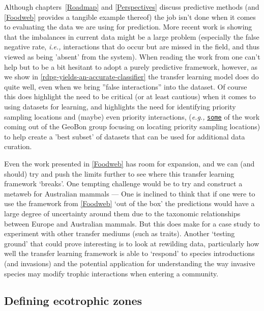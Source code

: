 Although chapters~\ref{Roadmap} and \ref{Perspectives} discuss predictive methods (and \autoref{Foodweb} provides a tangible example thereof) the job isn't done when it comes to evaluating the data we are using for prediction. More recent work is showing that the imbalances in current data might be a large problem (especially the false negative rate, \emph{i.e.,} interactions that do occur but are missed in the field, and thus viewed as being 'absent' from the system). When reading the work from \cite{Brimacombe2023Shortcomings, Catchen2023Missing, Poisot2023Guidelines} one can't help but to be a bit hesitant to adopt a purely predictive framework, however, as we show in \autoref{rdpg-yields-an-accurate-classifier} the transfer learning model does do quite well, even when we bring ''false interactions'' into the dataset. Of course this does highlight the need to be critical (or at least cautious) when it comes to using datasets for learning, and highlights the need for identifying priority sampling locations and (maybe) even priority interactions, (\emph{e.g.,} \href{https://github.com/EcoJulia/BiodiversityObservationNetworks.jl/tree/main}{\texttt{some}} of the work coming out of the GeoBon group focusing on locating priority sampling locations) to help create a 'best subset' of datasets that can be used for additional data curation.

Even the work presented in \autoref{Foodweb} has room for expansion, and we can (and should) try and push the limits further to see where this transfer learning framework `breaks'. One tempting challenge would be to try and construct a metaweb for Australian mammals --- One is inclined to think that if one were to use the framework from \autoref{Foodweb} `out of the box' the predictions would have a large degree of uncertainty around them due to the taxonomic relationships between Europe and Australian mammals. But this does make for a case study to experiment with other transfer mediums (such as traits). Another `testing ground' that could prove interesting is to look at rewilding data, particularly how well the transfer learning framework is able to `respond' to species introductions (and invasions) and the potential application for understanding the way invasive species may modify trophic interactions when entering a community.

\subsection{Defining ecotrophic zones}\label{Defining-ecotrophic-zones}


